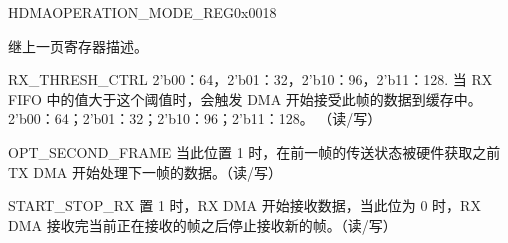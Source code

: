 \addtocounter{Regfloat}{-1}
\begin{register}{H}{DMAOPERATION\_MODE\_REG}{0x0018}
\begin{regdesc}\begin{reglist}
\item[继上一页寄存器描述。]

\item [RX\_THRESH\_CTRL] 2'b00：64，2'b01：32，2'b10：96，2'b11：128.
当 RX FIFO 中的值大于这个阈值时，会触发 DMA 开始接受此帧的数据到缓存中。2'b00：64；2'b01：32；2'b10：96；2'b11：128。
（读/写）
\item [OPT\_SECOND\_FRAME] 当此位置 1 时，在前一帧的传送状态被硬件获取之前 TX DMA 开始处理下一帧的数据。（读/写）
\item [START\_STOP\_RX] 置 1 时，RX DMA 开始接收数据，当此位为 0 时，RX DMA 接收完当前正在接收的帧之后停止接收新的帧。（读/写）
\end{reglist}\end{regdesc}
\end{register}

